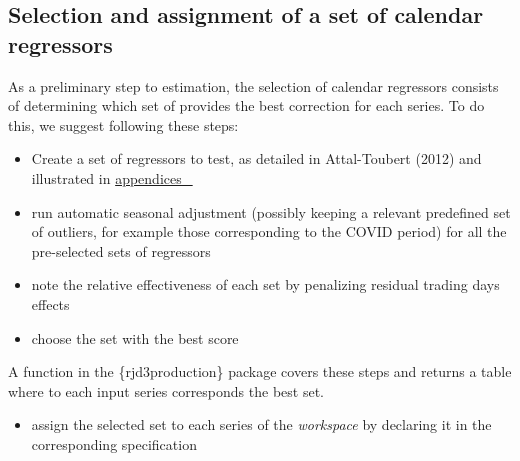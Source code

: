 \documentclass[
  letterpaper,
  DIV=11,
  numbers=noendperiod]{scrreprt}
\newenvironment{Shaded}{\begin{snugshade}}{\end{snugshade}}
\newcommand{\AttributeTok}[1]{\textcolor[rgb]{0.40,0.45,0.13}{#1}}
\newcommand{\FunctionTok}[1]{\textcolor[rgb]{0.28,0.35,0.67}{#1}}
\newcommand{\NormalTok}[1]{\textcolor[rgb]{0.00,0.23,0.31}{#1}}
\newcommand{\OtherTok}[1]{\textcolor[rgb]{0.00,0.23,0.31}{#1}}
\newcommand{\SpecialCharTok}[1]{\textcolor[rgb]{0.37,0.37,0.37}{#1}}
\newcommand{\StringTok}[1]{\textcolor[rgb]{0.13,0.47,0.30}{#1}}
\providecommand{\tightlist}{%
  \setlength{\itemsep}{0pt}\setlength{\parskip}{0pt}}\usepackage{longtable,booktabs,array}
\begin{document}
\hypertarget{selection-and-assignment-of-a-set-of-calendar-regressors}{%
\subsection*{Selection and assignment of a set of calendar
regressors}\label{selection-and-assignment-of-a-set-of-calendar-regressors}}

As a preliminary step to estimation, the selection of calendar
regressors consists of determining which set of provides the best
correction for each series. To do this, we suggest following these
steps:

\begin{itemize}
\item
  Create a set of regressors to test, as detailed in Attal-Toubert
  (2012) and illustrated in \protect\hyperlink{crea-regs}{appendices~🔗}
\item
  run automatic seasonal adjustment (possibly keeping a relevant
  predefined set of outliers, for example those corresponding to the
  COVID period) for all the pre-selected sets of regressors
\item
  note the relative effectiveness of each set by penalizing residual
  trading days effects
\item
  choose the set with the best score
\end{itemize}

A function in the \{rjd3production\} package covers these steps and
returns a table where to each input series corresponds the best set.

\begin{Shaded}
\end{Shaded}

\begin{itemize}
\tightlist
\item
  assign the selected set to each series of the \emph{workspace} by
  declaring it in the corresponding specification
\end{itemize}
\end{document}
